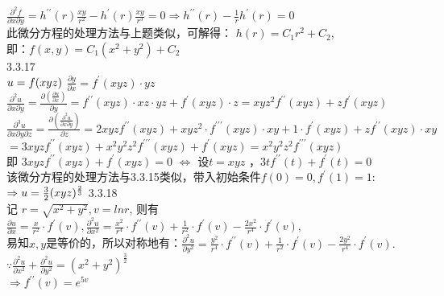 \documentclass[a4paper,11pt,UTF8]{article}
\begin{document}
$\frac{\partial^2 f}{\partial x \partial y}=h^{\prime \prime}(r) \frac{x y}{r^2}-h^{\prime}(r) \frac{x y}{r^3}=0 \Rightarrow h^{\prime \prime}(r)-\frac{1}{r} h^{\prime}(r)=0$\\
此微分方程的处理方法与上题类似，可解得： $h(r)=C_1 r^2+C_2$, \\
即：$f(x, y)=C_1\left(x^2+y^2\right)+C_2$\\
3.3.17\\
$  u=f(x y z) \\$
$ \frac{\partial y}{\partial x}=f^{\prime}(x y z) \cdot y z$ \\  $\frac{\partial^2 u}{\partial x \partial y}=\frac{\partial\left(\frac{\partial u}{\partial x}\right)}{\partial y}=f^{\prime \prime}(x y z) \cdot x z \cdot y z+f^{\prime}(x y z) \cdot z=x y z^2 f^{\prime \prime}(x y z)+z f^{\prime}(x y z)$ \\
$ \frac{\partial ^3 u}{\partial x \partial y \partial z}=\frac{\partial\left(\frac{\partial ^2 u}{\partial x \partial y}\right)}{\partial z}=  2 x y z f^{\prime \prime}(x y z)+x y z^2 \cdot f^{\prime \prime \prime}(x y z) \cdot x y  +1 \cdot f^{\prime}(x y z)+z f^{\prime \prime}(x y z) \cdot x y $\\ 
$=3 x y z f^{\prime \prime}(x y z)+x^2 y^2 z^2 f^{\prime \prime \prime}(x y z) +f^{\prime}(x y z) =x^2 y^2 z^2 f^{\prime \prime \prime}(x y z) $ \\ 
即 $3 x y z f^{\prime \prime}(x y z)+f^{\prime}(x y z)=0$ $\Leftrightarrow$ 设$t =xyz$ ，$3 t f^{\prime \prime}(t)+f^{\prime}(t)=0$ \\ 
该微分方程的处理方法与3.3.15类似，带入初始条件$ f(0)=0, f^{\prime}(1)=1:$\\ 
$\Rightarrow u=\frac{3}{2}(x y z)^{\frac{2}{3}} \\  $
3.3.18\\
记 $ r=\sqrt{x^2+y^2},v = lnr$, 则有
$\frac{\partial u}{\partial x}=\frac{x}{r^2} \cdot f^{\prime}(v), 
 \frac{\partial^2 u}{\partial x^2}=\frac{x^2}{r^4} \cdot f^{\prime \prime}(v)+\frac{1}{r^2} \cdot f^{\prime}(v)-\frac{2 x^2}{r^4} \cdot f^{\prime}(v), $\\
 易知$x,y$是等价的，所以对称地有：$\frac{\partial^2 u}{\partial y^2}=\frac{y^2}{r^4} \cdot f^{\prime \prime}(v)+\frac{1}{r^2} \cdot f^{\prime}(v)-\frac{2 y^2}{r^4} \cdot f^{\prime}(v).$\\
 $ \because\frac{\partial^2 u}{\partial x^2}+\frac{\partial^2 u}{\partial y^2}=\left(x^2+y^2\right)^{\frac{3}{2}}$ \\
 $\Rightarrow f^{\prime \prime}(v)=e^{5v}$\\
\end{document}
